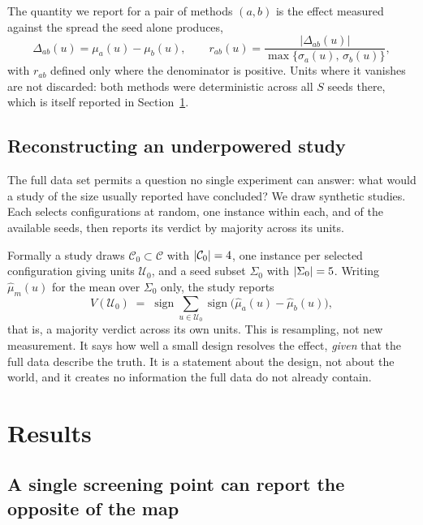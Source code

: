 \documentclass[runningheads]{llncs}
\begin{document}
The quantity we report for a pair of methods $(a,b)$ is the effect measured against the spread
the seed alone produces,
\begin{equation}
  \Delta_{ab}(u) = \mu_a(u)-\mu_b(u),
  \qquad
  r_{ab}(u) = \frac{|\Delta_{ab}(u)|}{\max\{\sigma_a(u),\,\sigma_b(u)\}} ,
  \label{eq:ratio}
\end{equation}
with $r_{ab}$ defined only where the denominator is positive. Units where it vanishes are not
discarded: both methods were deterministic across all $S$ seeds there, which is itself reported
in Section~\ref{sec:results}.

\subsection{Reconstructing an underpowered study}

The full data set permits a question no single experiment can answer: what would a study of the
size usually reported have concluded? We draw \numStudies{} synthetic studies. Each selects
\numStudyCells{} configurations at random, one instance within each, and \numStudySeeds{} of the
\numSeeds{} available seeds, then reports its verdict by majority across its units.

Formally a study draws $\mathcal{C}_0\subset\mathcal{C}$ with $|\mathcal{C}_0|=4$,
one instance per selected configuration giving units $\mathcal{U}_0$, and a seed subset
$\Sigma_0$ with $|\Sigma_0|=5$. Writing $\hat\mu_m(u)$ for the mean over
$\Sigma_0$ only, the study reports
\begin{equation}
  V(\mathcal{U}_0) \;=\; \operatorname{sign}
  \sum_{u\in\mathcal{U}_0} \operatorname{sign}\bigl(\hat\mu_a(u)-\hat\mu_b(u)\bigr),
  \label{eq:verdict}
\end{equation}
that is, a majority verdict across its own units. This is resampling, not new measurement. It
says how well a small design resolves the effect, \emph{given} that the full data describe the
truth. It is a statement about the design, not about
the world, and it creates no information the full data do not already contain.

\section{Results}
\label{sec:results}

\subsection{A single screening point can report the opposite of the map}
\end{document}
